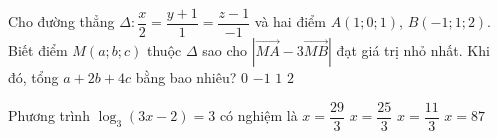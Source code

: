 \begin{ex}%
Cho đường thẳng $\Delta: \dfrac{x}{2}=\dfrac{y+1}{1}=\dfrac{z-1}{-1}$ và hai điểm $A(1;0;1)$, $B(-1;1;2)$. Biết điểm $M(a;b;c)$ thuộc $\Delta $ sao cho $\left| \overrightarrow{MA}-3\overrightarrow{MB} \right|$ đạt giá trị nhỏ nhất. Khi đó, tổng $a+2b+4c$ bằng bao nhiêu?
\choice
{$0$}  
{$-1$}  
{$1$}  
{\True $2$}
\end{ex}

\begin{ex}%
Phương trình $\log_{3}(3x-2)=3$ có nghiệm là
\choice
{\True $x=\dfrac{29}{3}$}  
{$x=\dfrac{25}{3}$}  
{$x=\dfrac{11}{3}$}  
{$x=87$}
\end{ex}

